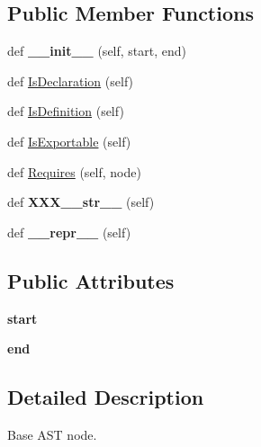\subsection*{Public Member Functions}
\begin{DoxyCompactItemize}
\item 
\mbox{\label{classcpp_1_1ast_1_1_node_a2cbd6969346645259afc3be51faae904}} 
def {\bfseries \+\_\+\+\_\+init\+\_\+\+\_\+} (self, start, end)
\item 
def \hyperlink{classcpp_1_1ast_1_1_node_ab3eca703a79fb65bc25dfbcb7547c79e}{Is\+Declaration} (self)
\item 
def \hyperlink{classcpp_1_1ast_1_1_node_a684ee9a357168e7e07a24fc6812f66e6}{Is\+Definition} (self)
\item 
def \hyperlink{classcpp_1_1ast_1_1_node_a313273874ccf578485006d4000128234}{Is\+Exportable} (self)
\item 
def \hyperlink{classcpp_1_1ast_1_1_node_a31ae211f954a8c578ef16226df5ac8c8}{Requires} (self, node)
\item 
\mbox{\label{classcpp_1_1ast_1_1_node_ab5dfeabcbcd7c1f5feb8522edffb8b4a}} 
def {\bfseries X\+X\+X\+\_\+\+\_\+str\+\_\+\+\_\+} (self)
\item 
\mbox{\label{classcpp_1_1ast_1_1_node_ab89915656a60c7b7c752e5baa607c532}} 
def {\bfseries \+\_\+\+\_\+repr\+\_\+\+\_\+} (self)
\end{DoxyCompactItemize}
\subsection*{Public Attributes}
\begin{DoxyCompactItemize}
\item 
\mbox{\label{classcpp_1_1ast_1_1_node_a7b2aa97e6a049bb1a93aea48c48f1f44}} 
{\bfseries start}
\item 
\mbox{\label{classcpp_1_1ast_1_1_node_a3c5e5246ccf619df28eca02e29d69647}} 
{\bfseries end}
\end{DoxyCompactItemize}


\subsection{Detailed Description}
\begin{DoxyVerb}Base AST node.\end{DoxyVerb}
 

